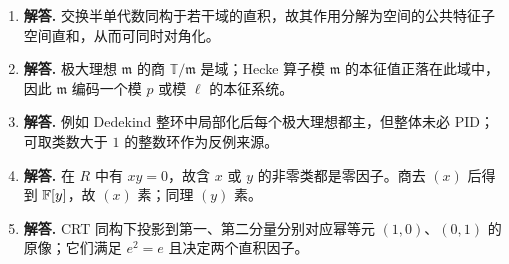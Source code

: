 \begin{enumerate}[label=\textbf{\arabic*.}, leftmargin=*, itemsep=1em]
\item \textbf{解答.} 交换半单代数同构于若干域的直积，故其作用分解为空间的公共特征子空间直和，从而可同时对角化。
\item \textbf{解答.} 极大理想 $\mathfrak m$ 的商 $\mathbb{T}/\mathfrak m$ 是域；Hecke 算子模 $\mathfrak m$ 的本征值正落在此域中，因此 $\mathfrak m$ 编码一个模 $p$ 或模 $\ell$ 的本征系统。
\item \textbf{解答.} 例如 Dedekind 整环中局部化后每个极大理想都主，但整体未必 PID；可取类数大于 $1$ 的整数环作为反例来源。
\item \textbf{解答.} 在 $R$ 中有 $xy=0$，故含 $x$ 或 $y$ 的非零类都是零因子。商去 $(x)$ 后得到 $\mathbb{F}[y]$，故 $(x)$ 素；同理 $(y)$ 素。
\item \textbf{解答.} CRT 同构下投影到第一、第二分量分别对应幂等元 $(1,0)$、$(0,1)$ 的原像；它们满足 $e^2=e$ 且决定两个直积因子。
\end{enumerate}
